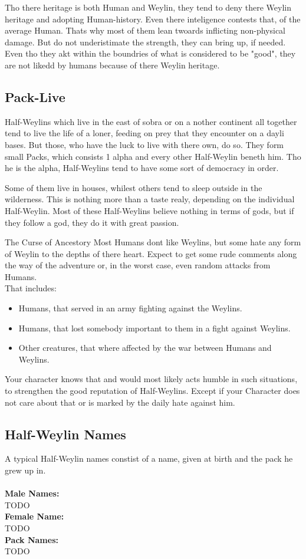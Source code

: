 \documentclass[10pt,twoside,twocolumn,openany]{book}
\begin{document}
Tho there heritage is both Human and Weylin, they tend to deny there Weylin heritage and adopting Human-history. Even there inteligence contests that, of the average Human. Thats why most of them lean twoards inflicting non-physical damage. But do not underistimate the strength, they can bring up, if needed. Even tho they akt within the boundries of what is considered to be "good", they are not likedd by humans because of there Weylin heritage.

\subsection{Pack-Live}
Half-Weylins which live in the east of sobra or on a nother continent all together tend to live the life of a loner, feeding on prey that they encounter on a dayli bases. But those, who have the luck to live with there own, do so. They form small Packs, which consists 1 alpha and every other Half-Weylin beneth him. Tho he is the alpha, Half-Weylins tend to have some sort of democracy in order.

Some of them live in houses, whilest others tend to sleep outside in the wilderness. This is nothing more than a taste realy, depending on the individual Half-Weylin. Most of these Half-Weylins believe nothing in terms of gods, but if they follow a god, they do it with great passion.

\begin{paperbox}{The Curse of Ancestory}
Most Humans dont like Weylins, but some hate any form of Weylin to the depths of there heart. Expect to get some rude comments along the way of the adventure or, in the worst case, even random attacks from Humans.\\
That includes: 
\begin{itemize}
\item Humans, that served in an army fighting against the Weylins.
\item Humans, that lost somebody important to them in a fight against Weylins.
\item Other creatures, that where affected by the war between Humans and Weylins.
\end{itemize}
Your character knows that and would most likely acts humble in such situations, to strengthen the good reputation of Half-Weylins. Except if your Character does not care about that or is marked by the daily hate against him.
\end{paperbox}
\subsection{Half-Weylin Names}
A typical Half-Weylin names constist of a name, given at birth and the pack he grew up in.\\\\
\textbf{Male Names:}\\
TODO\\
\textbf{Female Name:}\\
TODO\\
\textbf{Pack Names:}\\
TODO\\
\end{document}
